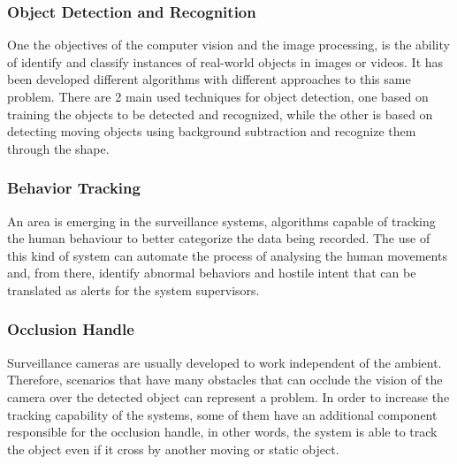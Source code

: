 \documentclass[journal,transmag]{IEEEtran}
\begin{document}
\subsubsection{Object Detection and Recognition}
One the objectives of the computer vision and the image processing, is the ability of identify and classify instances of real-world objects in images or videos.
It has been developed different algorithms with different approaches to this same problem. There are 2 main used techniques for object detection, one based on 
training the objects to be detected and recognized, while the other is based on detecting moving objects using background subtraction and recognize 
them through the shape.

\subsubsection{Behavior Tracking}
An area is emerging in the surveillance systems, algorithms capable of tracking the human behaviour to better categorize the data being recorded. The use of 
this kind of system can automate the process of analysing the human movements and, from there, identify abnormal behaviors and hostile intent  that can be 
translated as alerts for the system supervisors.

\subsubsection{Occlusion Handle}
Surveillance cameras are usually developed to work independent of the ambient. Therefore, scenarios that have many obstacles that can occlude the vision of 
the camera over the detected object can represent a problem. In order to increase the tracking capability of the systems, some of them have an additional 
component responsible for the occlusion handle, in other words, the system is able to track the object even if it cross by another moving or static object.
\end{document}
